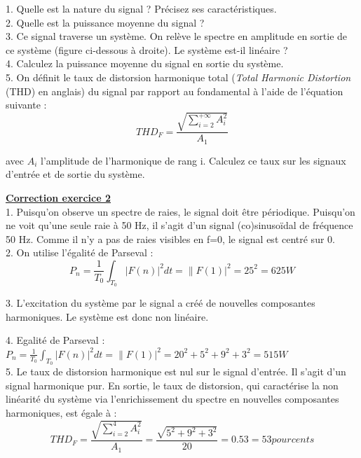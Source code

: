 \documentclass[11pt]{report}
\begin{document}
	1. Quelle est la nature du signal ? Précisez ses caractéristiques.\\
	
	2. Quelle est la puissance moyenne du signal ?\\
	
	3. Ce signal traverse un système. On relève le spectre en amplitude en sortie de ce système (figure ci-dessous à droite). Le système est-il linéaire ?\\
	
	4. Calculez la puissance moyenne du signal en sortie du système.\\
	
	5. On définit le taux de distorsion harmonique total (\textit{Total Harmonic Distortion} (THD) en anglais) du signal par rapport au fondamental à l'aide de l'équation suivante :
	\begin{equation*}
	THD_{F}=\frac{\sqrt{\sum_{i=2}^{+\infty}A_{i}^{2}}}{A_{1}}
	\end{equation*}
	
	 avec  $A_{i}$ l'amplitude de l'harmonique de rang i. Calculez ce taux sur les signaux d'entrée et de sortie du système.
	
	\vspace{1\baselineskip}
	
	\textbf{\underline{Correction exercice 2}}\\
	
	1. Puisqu'on observe un spectre de raies, le signal doit être périodique. Puisqu'on ne voit qu'une seule raie à 50 Hz, il s'agit d'un signal (co)sinusoïdal de fréquence 50 Hz. Comme il n'y a pas de raies visibles en f=0, le signal est centré sur 0.\\
	
	2. On utilise l'égalité de Parseval :
	\begin{equation*}
	P_{n}=\frac{1}{T_{0}}\int_{T_{0}}|F(n)|^{2}dt=\|F(1)|^{2}=25^2 = 625 W
	\end{equation*}
	
	3. L'excitation du système par le signal a créé de nouvelles composantes harmoniques. Le système est donc non linéaire.
	
	4. Egalité de Parseval : $P_{n}=\frac{1}{T_{0}}\int_{T_{0}}|F(n)|^{2}dt=\|F(1)|^{2}=20^2+5^2+9^2+3^2 = 515 W$\\
	
	5. Le taux de distorsion harmonique est nul sur le signal d'entrée. Il s'agit d'un signal harmonique pur. En sortie, le taux de distorsion, qui caractérise la non linéarité du système via l'enrichissement du spectre en nouvelles composantes harmoniques, est égale à :
	\begin{equation*}
	THD_{F}=\frac{\sqrt{\sum_{i=2}^{4}A_{i}^{2}}}{A_{1}}=\frac{\sqrt{5^2+9^2+3^2}}{20}=0.53=53 pourcents
	\end{equation*}
	
\end{document}
